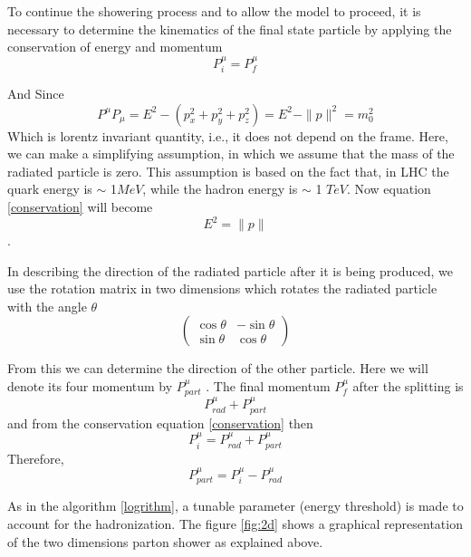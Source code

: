To continue the showering process and to allow the model to proceed, it is necessary to determine the kinematics of the final state particle by applying the conservation of energy and momentum 
\begin{equation}
P_i^{\mu} = P_f^{\mu}
\label{conservation}\end{equation}

And Since \begin{equation}
  P^{\mu} P_{\mu} = E^2 - (p_x^2 + p_y^2 + p_z^2) = E^2 - \|p\|^2 = m_0^2
\end{equation}
Which is lorentz invariant quantity, i.e., it does not depend on the frame. Here, we can make a simplifying assumption, in which we assume that the mass of the radiated particle is zero. This assumption is based on the fact that, in LHC the quark energy is $\sim$ 1$\si{MeV}$,
while
the hadron energy is $\sim$ 1 $\si{TeV}$. Now equation \ref{conservation} will become \begin{equation}
E^2 = \|p\|
\label{important}\end{equation}\citep{Salam:2010zt}.    
  
In describing the direction of the radiated particle after it is being produced, we use the rotation matrix in two dimensions which rotates the radiated particle with the angle $\theta$ 
\begin{equation}
\begin{pmatrix}
\cos \theta & - \sin \theta\\
\sin \theta & \cos \theta
\end{pmatrix}
\end{equation}   

From this we can determine the direction of the other particle. Here we will denote its four momentum by $P_{part}^{\mu}$ . The final momentum  $P^{\mu}_{f}$ after the splitting is 
\begin{equation}
P_{rad}^{\mu} + P_{part}^{\mu}
\end{equation} and from the conservation equation \ref{conservation} then \begin{equation}
P^{\mu}_{i} = P_{rad}^{\mu} + P_{part}^{\mu}
\end{equation} Therefore, \begin{equation}
P_{part}^{\mu} = P^{\mu}_{i} - P_{rad}^{\mu} 
\end{equation}     

As in the algorithm \ref{logrithm},
a tunable parameter (energy threshold)
is made to account for the hadronization. The figure \ref{fig:2d} shows a graphical representation of the two dimensions parton shower as explained above.
     
